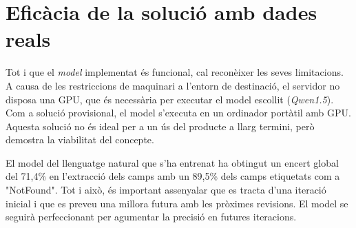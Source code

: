 \section{Eficàcia de la solució amb dades reals}


Tot i que el \textit{model} implementat és funcional, cal reconèixer les seves limitacions. A causa de les restriccions de maquinari a l'entorn de destinació, el servidor no disposa una GPU, que és necessària per executar el model escollit (\textit{Qwen1.5}). Com a solució provisional, el model s'executa en un ordinador portàtil amb GPU. Aquesta solució no és ideal per a un ús del producte a llarg termini, però demostra la viabilitat del concepte.

El model del llenguatge natural que s'ha entrenat ha obtingut un encert global del 71,4\% en l'extracció dels camps amb un 89,5\% dels camps etiquetats com a "NotFound". Tot i això, és important assenyalar que es tracta d'una iteració inicial i que es preveu una millora futura amb les pròximes revisions. El model se seguirà perfeccionant per agumentar la precisió en futures iteracions.

